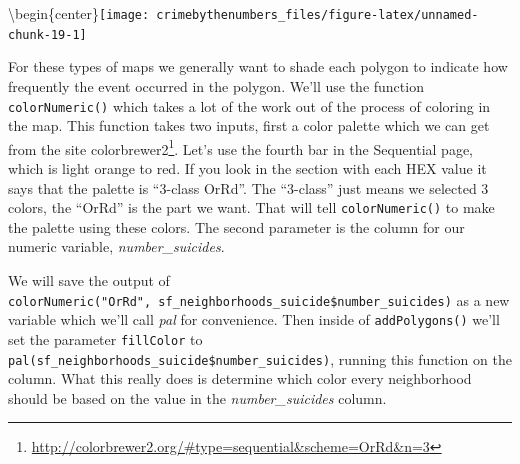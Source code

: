 \documentclass[
]{krantz}
\makeatletter
\newenvironment{Shaded}{\begin{snugshade}}{\end{snugshade}}
\newcommand{\AttributeTok}[1]{\textcolor[rgb]{0.61,0.61,0.61}{#1}}
\newcommand{\DecValTok}[1]{\textcolor[rgb]{0.06,0.06,0.06}{#1}}
\newcommand{\FunctionTok}[1]{\textcolor[rgb]{0,0,0}{#1}}
\newcommand{\NormalTok}[1]{#1}
\newcommand{\OtherTok}[1]{\textcolor[rgb]{0.37,0.37,0.37}{#1}}
\newcommand{\SpecialCharTok}[1]{\textcolor[rgb]{0,0,0}{#1}}
\newcommand{\StringTok}[1]{\textcolor[rgb]{0.5,0.5,0.5}{#1}}
\renewcommand{\href}[2]{#2\footnote{\url{#1}}}
\newenvironment{kframe}{%
\medskip{}
\setlength{\fboxsep}{.8em}
 \def\at@end@of@kframe{}%
 \ifinner\ifhmode%
  \def\at@end@of@kframe{\end{minipage}}%
  \begin{minipage}{\columnwidth}%
 \fi\fi%
 \def\FrameCommand##1{\hskip\@totalleftmargin \hskip-\fboxsep
 \colorbox{shadecolor}{##1}\hskip-\fboxsep
     \hskip-\linewidth \hskip-\@totalleftmargin \hskip\columnwidth}%
 \MakeFramed {\advance\hsize-\width
   \@totalleftmargin\z@ \linewidth\hsize
   \@setminipage}}%
 {\par\unskip\endMakeFramed%
 \at@end@of@kframe}
\renewenvironment{Shaded}{\begin{kframe}}{\end{kframe}}
\makeatother
\begin{document}
\textbackslash begin\{center\}\texttt{[image: crimebythenumbers\_files/figure-latex/unnamed-chunk-19-1]}

For these types of maps we generally want to shade each polygon to indicate how frequently the event occurred in the polygon. We'll use the function \texttt{colorNumeric()} which takes a lot of the work out of the process of coloring in the map. This function takes two inputs, first a color palette which we can get from the site \href{http://colorbrewer2.org/\#type=sequential\&scheme=OrRd\&n=3}{colorbrewer2}. Let's use the fourth bar in the Sequential page, which is light orange to red. If you look in the section with each HEX value it says that the palette is ``3-class OrRd''. The ``3-class'' just means we selected 3 colors, the ``OrRd'' is the part we want. That will tell \texttt{colorNumeric()} to make the palette using these colors. The second parameter is the column for our numeric variable, \emph{number\_suicides}.

We will save the output of \texttt{colorNumeric("OrRd",\ sf\_neighborhoods\_suicide\$number\_suicides)} as a new variable which we'll call \emph{pal} for convenience. Then inside of \texttt{addPolygons()} we'll set the parameter \texttt{fillColor} to \texttt{pal(sf\_neighborhoods\_suicide\$number\_suicides)}, running this function on the column. What this really does is determine which color every neighborhood should be based on the value in the \emph{number\_suicides} column.

\begin{Shaded}
\end{Shaded}
\end{document}

